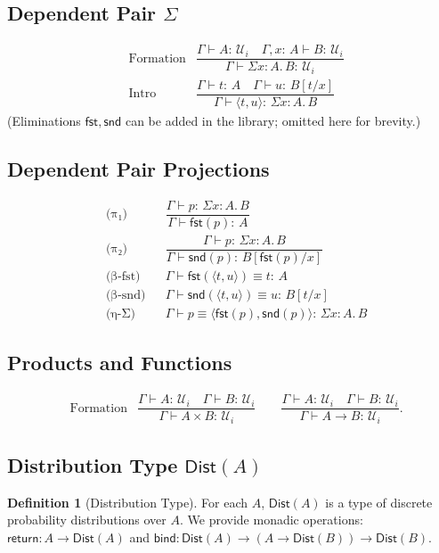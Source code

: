 \documentclass[12pt]{article}
\newcommand{\Entails}{\vdash}
\newcommand{\Types}{:\,}
\newcommand{\Subst}[2]{[#1/#2]}
\newcommand{\Pair}[2]{\langle #1, #2 \rangle}
\newcommand{\Ctx}{\Gamma}
\newcommand{\UU}[1]{\mathcal{U}_{#1}}
\newcommand{\SigT}[3]{\Sigma #1 : #2.\, #3}
\newcommand{\Dist}[1]{\mathsf{Dist}(#1)}
\theoremstyle{definition}
\newtheorem{definition}{Definition}
\begin{document}
\subsection{Dependent Pair $\Sigma$}
\begin{align*}
&\text{Formation} & \dfrac{\Ctx \Entails A \Types \UU{i} \quad \Ctx,x\Types A \Entails B \Types \UU{i}}{\Ctx \Entails \SigT{x}{A}{B} \Types \UU{i}} \\
&\text{Intro} & \dfrac{\Ctx \Entails t \Types A \quad \Ctx \Entails u \Types B\Subst{t}{x}}{\Ctx \Entails \Pair{t}{u} \Types \SigT{x}{A}{B}}
\end{align*}
(Eliminations $ \mathsf{fst}, \mathsf{snd}$ can be added in the library; omitted here for brevity.)

\subsection{Dependent Pair Projections}
\begin{align*}
&\text{(π₁)} && \dfrac{\Ctx \Entails p \Types \SigT{x}{A}{B}}
                      {\Ctx \Entails \mathsf{fst}(p) \Types A} \\
&\text{(π₂)} && \dfrac{\Ctx \Entails p \Types \SigT{x}{A}{B}}
                      {\Ctx \Entails \mathsf{snd}(p) \Types B[\mathsf{fst}(p)/x]} \\
&\text{(β-fst)} && \Ctx \Entails \mathsf{fst}(\Pair{t}{u}) \equiv t \Types A \\
&\text{(β-snd)} && \Ctx \Entails \mathsf{snd}(\Pair{t}{u}) \equiv u \Types B[t/x] \\
&\text{(η-Σ)} && \Ctx \Entails p \equiv \Pair{\mathsf{fst}(p)}{\mathsf{snd}(p)} \Types \SigT{x}{A}{B}
\end{align*}

\subsection{Products and Functions}
\begin{align*}
&\text{Formation} & \dfrac{\Ctx \Entails A \Types \UU{i} \quad \Ctx \Entails B \Types \UU{i}}{\Ctx \Entails A\times B \Types \UU{i}} \qquad
\dfrac{\Ctx \Entails A \Types \UU{i} \quad \Ctx \Entails B \Types \UU{i}}{\Ctx \Entails A\to B \Types \UU{i}}.
\end{align*}

\subsection{Distribution Type $\Dist{A}$}
\begin{definition}[Distribution Type]
For each $A$, $\Dist{A}$ is a type of discrete probability distributions over $A$. We provide monadic operations: $\mathsf{return} : A \to \Dist{A}$ and $\mathsf{bind} : \Dist{A} \to (A\to \Dist{B}) \to \Dist{B}$.
\end{definition}
\end{document}
